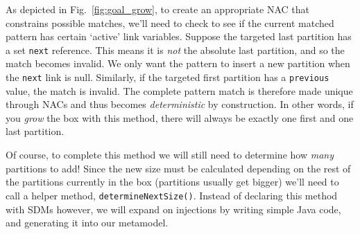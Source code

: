 As depicted in Fig.~\ref{fig:goal_grow}, to create an appropriate \mbox{NAC} that constrains possible matches, we'll need to check to see if the current matched
pattern has certain `active' link variables. Suppose the targeted last partition has a set \texttt{next} reference. This means it is \emph{not} the absolute
last partition, and so the match becomes invalid. We only want the pattern to insert a new partition when the \texttt{next} link is null. Similarly, if the
targeted first partition has a \texttt{previous} value, the match is invalid. The complete pattern match is therefore made unique through NACs and thus becomes
\emph{deterministic} by construction. In other words, if you \emph{grow} the box with this method, there will always be exactly one first and one last
partition.

Of course, to complete this method we will still need to determine how \emph{many} partitions to add! Since the new size must be calculated depending on the
rest of the partitions currently in the box (partitions usually get bigger) we'll need to call a helper method, \texttt{determineNextSize()}. Instead of declaring this
method with SDMs however, we will expand on injections by writing simple Java code, and generating it into our metamodel.






